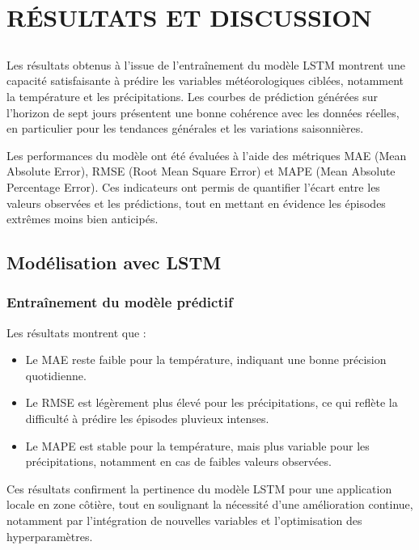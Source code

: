 \documentclass[a4paper,12pt,openany]{report}
\begin{document}
	
	\chapter{RÉSULTATS ET DISCUSSION}
	\label{ch:résultatsetdiscussion} %
%	

%	
\section*{}
\quad Les résultats obtenus à l’issue de l’entraînement du modèle LSTM montrent une capacité satisfaisante à prédire les variables météorologiques ciblées, notamment la température et les précipitations. Les courbes de prédiction générées sur l’horizon de sept jours présentent une bonne cohérence avec les données réelles, en particulier pour les tendances générales et les variations saisonnières.

\quad Les performances du modèle ont été évaluées à l’aide des métriques MAE (Mean Absolute Error), RMSE (Root Mean Square Error) et MAPE (Mean Absolute Percentage Error). Ces indicateurs ont permis de quantifier l’écart entre les valeurs observées et les prédictions, tout en mettant en évidence les épisodes extrêmes moins bien anticipés.

\section{Modélisation avec LSTM}

\subsection{Entraînement du modèle prédictif}
\quad Les résultats montrent que :
\begin{itemize}
	\item Le MAE reste faible pour la température, indiquant une bonne précision quotidienne.
	\item Le RMSE est légèrement plus élevé pour les précipitations, ce qui reflète la difficulté à prédire les épisodes pluvieux intenses.
	\item Le MAPE est stable pour la température, mais plus variable pour les précipitations, notamment en cas de faibles valeurs observées.
\end{itemize}

\quad Ces résultats confirment la pertinence du modèle LSTM pour une application locale en zone côtière, tout en soulignant la nécessité d’une amélioration continue, notamment par l’intégration de nouvelles variables et l’optimisation des hyperparamètres.
\end{document}

